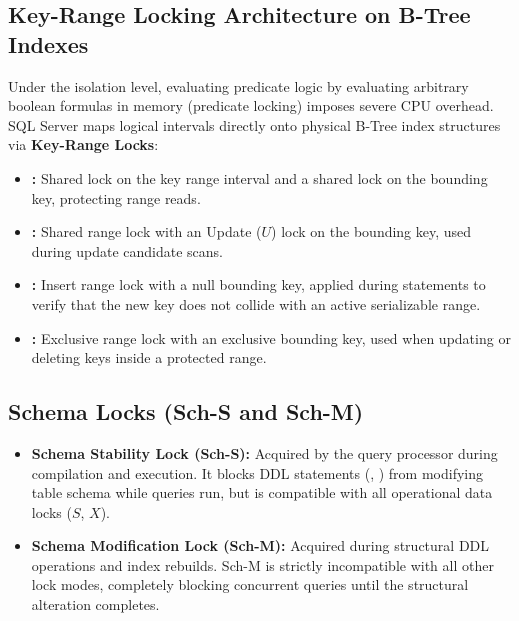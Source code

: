 \subsection{Key-Range Locking Architecture on B-Tree Indexes}
Under the  isolation level, evaluating predicate logic by evaluating arbitrary boolean formulas in memory (predicate locking) imposes severe CPU overhead. SQL Server maps logical intervals directly onto physical B-Tree index structures via \textbf{Key-Range Locks}:
\begin{itemize}
    \item \textbf{:} Shared lock on the key range interval and a shared lock on the bounding key, protecting range reads.
    \item \textbf{:} Shared range lock with an Update ($U$) lock on the bounding key, used during update candidate scans.
    \item \textbf{:} Insert range lock with a null bounding key, applied during  statements to verify that the new key does not collide with an active serializable range.
    \item \textbf{:} Exclusive range lock with an exclusive bounding key, used when updating or deleting keys inside a protected range.
\end{itemize}

\subsection{Schema Locks (Sch-S and Sch-M)}
\begin{itemize}
    \item \textbf{Schema Stability Lock (Sch-S):} Acquired by the query processor during compilation and execution. It blocks DDL statements (, ) from modifying table schema while queries run, but is compatible with all operational data locks ($S$, $X$).
    \item \textbf{Schema Modification Lock (Sch-M):} Acquired during structural DDL operations and index rebuilds. Sch-M is strictly incompatible with all other lock modes, completely blocking concurrent queries until the structural alteration completes.
\end{itemize}

